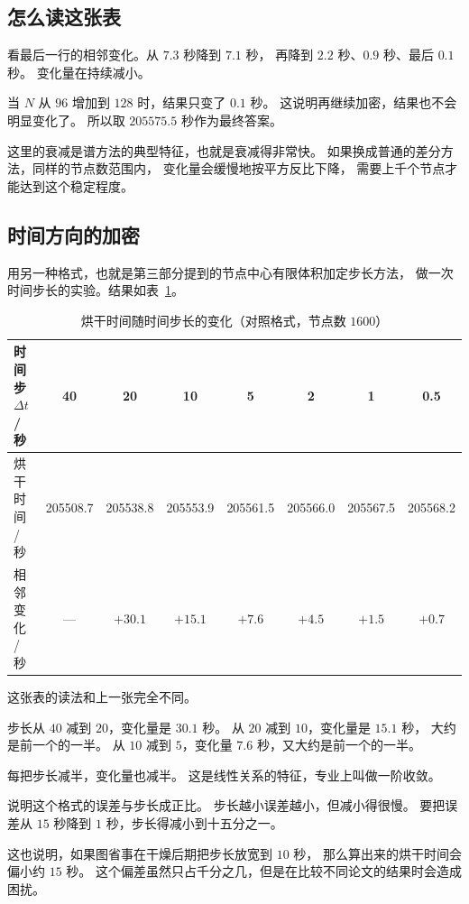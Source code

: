 \subsection{怎么读这张表}

看最后一行的相邻变化。从 $7.3$ 秒降到 $7.1$ 秒，
再降到 $2.2$ 秒、$0.9$ 秒、最后 $0.1$ 秒。
变化量在持续减小。

当 $N$ 从 $96$ 增加到 $128$ 时，结果只变了 $0.1$ 秒。
这说明再继续加密，结果也不会明显变化了。
所以取 $205575.5$ 秒作为最终答案。

这里的衰减是谱方法的典型特征，也就是衰减得非常快。
如果换成普通的差分方法，同样的节点数范围内，
变化量会缓慢地按平方反比下降，
需要上千个节点才能达到这个稳定程度。

\subsection{时间方向的加密}

用另一种格式，也就是第三部分提到的节点中心有限体积加定步长方法，
做一次时间步长的实验。结果如表~\ref{tab:verify3}。

\begin{table}[H]
\centering
\small
\caption{烘干时间随时间步长的变化（对照格式，节点数 $1600$）}
\label{tab:verify3}
\begin{tabular}{@{}lccccccc@{}}
\toprule
时间步 $\Delta t$ / 秒 & 40 & 20 & 10 & 5 & 2 & 1 & 0.5 \\
\midrule
烘干时间 / 秒 & 205508.7 & 205538.8 & 205553.9 & 205561.5 & 205566.0 & 205567.5 & 205568.2 \\
相邻变化 / 秒 & --- & $+30.1$ & $+15.1$ & $+7.6$ & $+4.5$ & $+1.5$ & $+0.7$ \\
\bottomrule
\end{tabular}
\end{table}

这张表的读法和上一张完全不同。

步长从 $40$ 减到 $20$，变化量是 $30.1$ 秒。
从 $20$ 减到 $10$，变化量是 $15.1$ 秒，
大约是前一个的一半。
从 $10$ 减到 $5$，变化量 $7.6$ 秒，又大约是前一个的一半。

每把步长减半，变化量也减半。
这是线性关系的特征，专业上叫做一阶收敛。

说明这个格式的误差与步长成正比。
步长越小误差越小，但减小得很慢。
要把误差从 $15$ 秒降到 $1$ 秒，步长得减小到十五分之一。

这也说明，如果图省事在干燥后期把步长放宽到 $10$ 秒，
那么算出来的烘干时间会偏小约 $15$ 秒。
这个偏差虽然只占千分之几，但是在比较不同论文的结果时会造成困扰。


